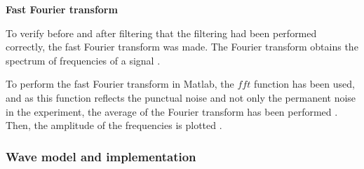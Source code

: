 \documentclass[12pt, a4paper]{article} %
\begin{document}
	\setlength{\parindent}{0pt}
	\setlength{\parskip}{8mm}
	\textbf{Fast Fourier transform}
	\setlength{\parskip}{0mm}
	
	To verify before and after filtering that the filtering had been performed correctly, the fast Fourier transform was made. The Fourier transform obtains the spectrum of frequencies of a signal \cite{de2001transformada}.
	
	\setlength{\parskip}{4mm}
	\setlength{\parindent}{8pt}
	
	To perform the fast Fourier transform in Matlab, the $fft$ function has been used, and as this function reflects the punctual noise and not only the permanent noise in the experiment, the average of the Fourier transform has been performed \cite{shabaninezhad2021matlab}. Then, the amplitude of the frequencies is plotted \cite{FourierTransform, frigo1998fftw}.
	
	\setlength{\parskip}{0mm}
	\subsubsection{Wave model and implementation}
	
\end{document}
